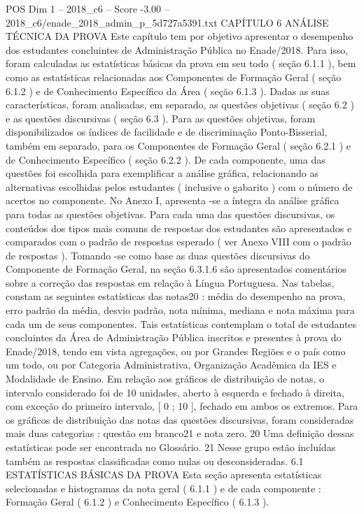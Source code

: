 \begin{textsample}{POS Dim 1 – 2018\_c6 – Score -3.00 – 2018\_c6/enade\_2018\_admin\_p\_5d727a5391.txt}  \label{ex:f1_pos_250}
CAPÍTULO 6 ANÁLISE TÉCNICA DA PROVA Este capítulo tem por objetivo apresentar o desempenho dos estudantes concluintes de Administração Pública no Enade/2018.
Para isso, foram calculadas as estatísticas básicas da prova em seu todo ( seção 6.1.1 ), bem como as estatísticas relacionadas aos Componentes de Formação Geral ( seção 6.1.2 ) e de Conhecimento Específico da Área ( seção 6.1.3 ).
Dadas as suas características, foram analisadas, em separado, as questões objetivas ( seção 6.2 ) e as questões discursivas ( seção 6.3 ).
Para as questões objetivas, foram disponibilizados os índices de facilidade e de discriminação Ponto-Bisserial, também em separado, para os Componentes de Formação Geral ( seção 6.2.1 ) e de Conhecimento Específico ( seção 6.2.2 ).
De cada componente, uma das questões foi escolhida para exemplificar a análise gráfica, relacionando as alternativas escolhidas pelos estudantes ( inclusive o gabarito ) com o número de acertos no componente.
No Anexo I, apresenta -se a íntegra da análise gráfica para todas as questões objetivas.
Para cada uma das questões discursivas, os conteúdos dos tipos mais comuns de respostas dos estudantes são apresentados e comparados com o padrão de respostas esperado ( ver Anexo VIII com o padrão de respostas ).
Tomando -se como base as duas questões discursivas do Componente de Formação Geral, na seção 6.3.1.6 são apresentados comentários sobre a correção das respostas em relação à Língua Portuguesa.
Nas tabelas, constam as seguintes estatísticas das notas20 : média do desempenho na prova, erro padrão da média, desvio padrão, nota mínima, mediana e nota máxima para cada um de seus componentes.
Tais estatísticas contemplam o total de estudantes concluintes da Área de Administração Pública inscritos e presentes à prova do Enade/2018, tendo em vista agregações, ou por Grandes Regiões e o país como um todo, ou por Categoria Administrativa, Organização Acadêmica da IES e Modalidade de Ensino.
Em relação aos gráficos de distribuição de notas, o intervalo considerado foi de 10 unidades, aberto à esquerda e fechado à direita, com exceção do primeiro intervalo, [ 0 ; 10 ], fechado em ambos os extremos.
Para os gráficos de distribuição das notas das questões discursivas, foram consideradas mais duas categorias : questão em branco21 e nota zero. 20 Uma definição dessas estatísticas pode ser encontrada no Glossário. 21 Nesse grupo estão incluídas também as respostas classificadas como nulas ou desconsideradas. 6.1 ESTATÍSTICAS BÁSICAS DA PROVA Esta seção apresenta estatísticas selecionadas e histogramas da nota geral ( 6.1.1 ) e de cada componente : Formação Geral ( 6.1.2 ) e Conhecimento Específico ( 6.1.3 ).

\end{textsample}
